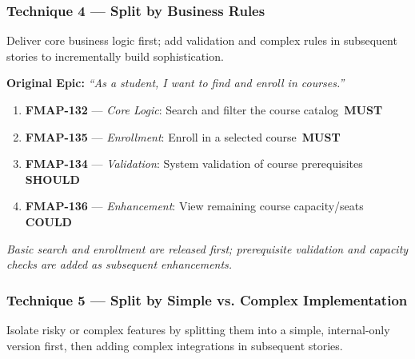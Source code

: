 \documentclass[12pt, a4paper]{article}
\newcommand{\mustbadge}{\colorbox{mustcolor}{\color{white}\tiny\bfseries\,MUST\,}}
\newcommand{\shouldbadge}{\colorbox{shouldcolor}{\color{white}\tiny\bfseries\,SHOULD\,}}
\newcommand{\couldbadge}{\colorbox{couldcolor}{\color{white}\tiny\bfseries\,COULD\,}}
\begin{document}
\subsubsection{Technique 4 --- Split by Business Rules}

Deliver core business logic first; add validation and complex rules in subsequent stories to incrementally build sophistication.

\vspace{6pt}
\begin{tcolorbox}[storybox,title={\textbf{Example: Course Enrollment (Curriculum Module)}},fonttitle=\bfseries\color{agileblue}]
\textbf{Original Epic:} \textit{``As a student, I want to find and enroll in courses.''}
\vspace{4pt}
\begin{enumerate}[itemsep=2pt]
\item \textbf{FMAP-132} --- \textit{Core Logic}: Search and filter the course catalog \mustbadge
\item \textbf{FMAP-135} --- \textit{Enrollment}: Enroll in a selected course \mustbadge
\item \textbf{FMAP-134} --- \textit{Validation}: System validation of course prerequisites \shouldbadge
\item \textbf{FMAP-136} --- \textit{Enhancement}: View remaining course capacity/seats \couldbadge
\end{enumerate}
\textit{Basic search and enrollment are released first; prerequisite validation and capacity checks are added as subsequent enhancements.}
\end{tcolorbox}

\vspace{10pt}
\subsubsection{Technique 5 --- Split by Simple vs. Complex Implementation}

Isolate risky or complex features by splitting them into a simple, internal-only version first, then adding complex integrations in subsequent stories.
\end{document}
